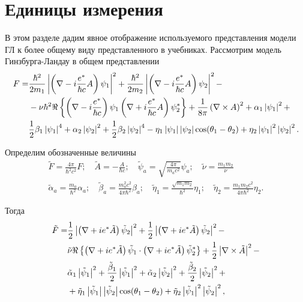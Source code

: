 \section{Единицы измерения}
\label{sec:units}

В этом разделе дадим явное отображение используемого представления модели ГЛ к 
более общему виду представленного в учебниках. Рассмотрим модель 
Гинзбурга-Ландау в общем представлении
\begin{align}
  F = & \frac{\hbar^2}{2m_1} \left| \left( \nabla - i\frac{e^*}{\hbar c} A\right)
    \psi_1 \right|^2 + \frac{\hbar^2}{2m_2} \left| \left( \nabla - i\frac{e^*}{\hbar c}A
    \right) \psi_2 \right|^2 - \nonumber \\
  & - \nu\hbar^2 \Re\left\{ \left( \nabla - i\frac{e^*}{\hbar c}
    \right)\psi_1 \left( \nabla + i\frac{e^*}{\hbar c}A \right)
    \psi^*_2\right\} + \frac{1}{8\pi}\left( \nabla\times A \right)^2 +
    \alpha_1\left| \psi_1 \right|^2 + \nonumber \\
  & \frac{1}{2}\beta_1\left| \psi_1 \right|^4 + \alpha_2\left| \psi_2 \right|^2 + \frac{1}{2}
    \beta_2\left| \psi_2 \right|^4 - \eta_1\left| \psi_1 \right|\left| \psi_2 \right|
    \cos(\theta_1 - \theta_2) + \eta_2\left| \psi_1 \right|^2\left| \psi_2 \right|^2.
    \label{eq:B-1}
\end{align}

Определим обозначенные величины
\begin{gather}
  \tilde{F} = \frac{4\pi}{\hbar^2 c^2}F; \quad
    \tilde{A} = -\frac{A}{\hbar c}; \quad
    \tilde{\psi}_a = \sqrt{\frac{4\pi}{m_a c^2}}\psi_a; \quad
    \tilde{\nu} = \frac{m_1m_2}\nu \nonumber \\
  \tilde{\alpha}_a = \frac{m_a}{\hbar^2}\alpha_a; \quad
    \tilde{\beta}_a = \frac{m^2_a c^2}{4\pi\hbar^2}\beta_a; \quad
    \tilde{\eta}_1 = \frac{\sqrt{m_1 m_2}}{\hbar^2}\eta_1; \quad
    \tilde{\eta}_2 = \frac{m_1 m_2 c^2}{4\pi\hbar^2}\eta_2. \label{eq:B-2}
\end{gather}

Тогда
\begin{align}
  \tilde{F} = & \frac{1}{2}\left| \left( \nabla + ie^*\tilde{A} \right)
    \tilde{\psi}_2 \right|^2 + \frac{1}{2}\left| \left( \nabla + ie^*\tilde{A} \right)
    \tilde{\psi}_2 \right|^2 - \nonumber \\ 
  & \tilde{\nu} \Re\left\{ \left( \nabla + ie^*\tilde{A}
    \right)\tilde{\psi}_1 \cdot \left( \nabla + ie^*\tilde{A} \right)
    \tilde{\psi}^*_2 \right\} + \frac{1}{2}\left| \nabla\times\tilde{A} \right|^2 - 
    \nonumber \\
  & \tilde{\alpha}_1
    \left| \tilde{\psi}_1 \right|^2 + \frac{\tilde{\beta}_1}{2}\left| \tilde{\psi}_1 \right|^2 +
    \tilde{\alpha}_2\left| \tilde{\psi}_2 \right|^2 +
    \frac{\tilde{\beta}_2}{2}\left| \tilde{\psi}_2 \right|^2 + \nonumber \\
  & + \tilde{\eta}_1 \left| \tilde{\psi}_1 \right| \left| \tilde{\psi}_2 \right|
    \cos(\theta_1 - \theta_2) + \tilde{\eta}_2\left| \tilde{\psi}_1 \right|^2
    \left| \tilde{\psi}_2 \right|^2, \label{eq:B-3}
\end{align}

